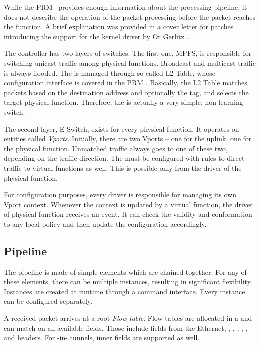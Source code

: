 While the PRM~\cite{mlx-prm} provides enough information about the processing
pipeline, it does not describe the operation of the packet processing before
the packet reaches the  function. A brief explanation was provided in
a cover letter for patches introducing the  support for the kernel driver
by Or Gerlitz~\cite{lwn-mlx-sriov}.

The controller has two layers of switches. The first one, \acrfull{MPFS}, is
responsible for switching unicast traffic among physical functions. Broadcast
and multicast traffic is always flooded. The  is managed through
so-called L2 Table, whose configuration interface is covered in the PRM
\cite{mlx-prm}. Basically, the L2 Table matches packets based on the destination
 address and optionally the  tag, and selects the target physical
function. Therefore, the  is actually a very simple, non-learning
switch.

The second layer, \acrfull{E-Switch}, exists for every physical function.
It operates on entities called \emph{Vports}. Initially, there are two Vports
-- one for the uplink, one for the physical function. Unmatched traffic always
goes to one of these two, depending on the traffic direction. The
 must be configured with rules to direct traffic to virtual
functions as well. This is possible only from the driver of the physical
function.

For configuration purposes, every driver is responsible for managing its
own Vport context. Whenever the context is updated by a virtual function, the
driver of physical function receives an event. It can check the validity and
conformation to any local policy and then update the configuration accordingly.

\subsection{Pipeline}
\label{mlx:pipeline}

The pipeline is made of simple elements which are chained together. For any of
these elements, there can be multiple instances, resulting in significant
flexibility. Instances are created at runtime through a command interface.
Every instance can be configured separately.

A received packet arrives at a root \emph{Flow table}. Flow tables are allocated
in a  and can match on all available fields. Those include fields from the
Ethernet, , , , , ,  and
 headers. For -in- tunnels, inner fields are supported as
well.

